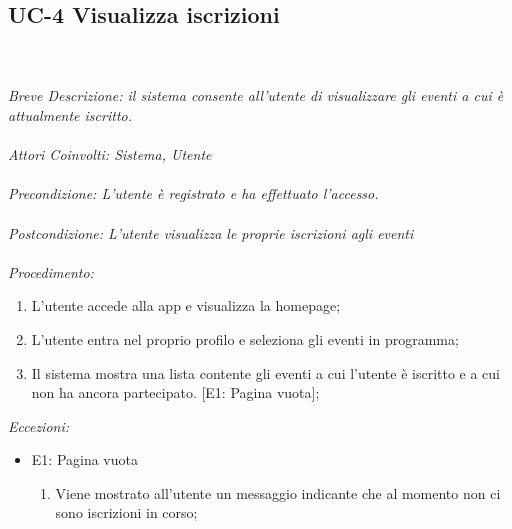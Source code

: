 \subsection{UC-4 Visualizza iscrizioni}
\\
\\
\textit{Breve Descrizione: il sistema consente all'utente di visualizzare gli eventi a cui è attualmente iscritto.} 
\\
\\
\textit{Attori Coinvolti: Sistema, Utente}
\\
\\
\textit{Precondizione: L'utente è registrato e ha effettuato l'accesso.}
\\
\\
\textit{Postcondizione: L'utente visualizza le proprie iscrizioni agli eventi}
\\
\\
\textit{Procedimento:}
\begin{enumerate}
	\item L'utente accede alla app e visualizza la homepage;
	\item L'utente entra nel proprio profilo e seleziona gli eventi in programma;
	\item Il sistema mostra una lista contente gli eventi a cui l'utente è iscritto e a cui non ha ancora partecipato. [E1: Pagina vuota];
\end{enumerate}


\textit{Eccezioni:}
\begin{itemize}
	\item E1: Pagina vuota
	\begin{enumerate}
		\item Viene mostrato all'utente un messaggio indicante che al momento non ci sono iscrizioni in corso;
	\end{enumerate}
\end{itemize}

